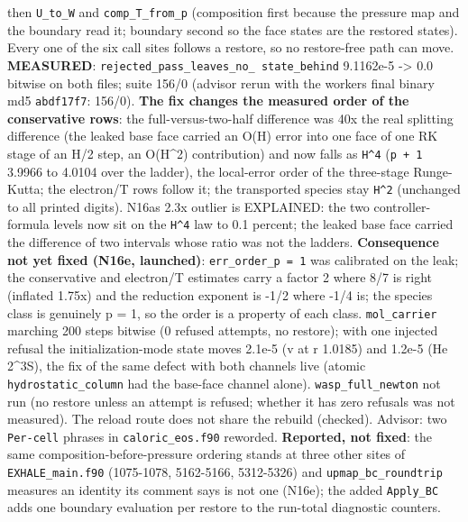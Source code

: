 \documentclass[english,a4paper]{my_memo}
\begin{document}
\begin{itemize}
  then \texttt{U\_to\_W} and \texttt{comp\_T\_from\_p} (composition first because the pressure
  map and the boundary read it; boundary second so the face states are the
  restored state\textquotesingle s). Every one of the six call sites follows a restore, so
  no restore-free path can move. \textbf{MEASURED}: \texttt{rejected\_pass\_leaves\_no\_\ state\_behind} 9.1162e-5 -\textgreater{} 0.0 bitwise on both files; suite 156/0
  (advisor rerun with the worker\textquotesingle s final binary md5 \texttt{abdf17f7}: 156/0).
  \textbf{The fix changes the measured order of the conservative rows}: the
  full-versus-two-half difference was 40x the real splitting difference
  (the leaked base face carried an O(H) error into one face of one RK
  stage of an H/2 step, an O(H\^{}2) contribution) and now falls as \texttt{H\^{}4}
  (\texttt{p\ +\ 1} 3.9966 to 4.0104 over the ladder), the local-error order of the
  three-stage Runge-Kutta; the electron/T rows follow it; the transported
  species stay \texttt{H\^{}2} (unchanged to all printed digits). N16a\textquotesingle s 2.3x outlier
  is EXPLAINED: the two controller-formula levels now sit on the \texttt{H\^{}4} law
  to 0.1 percent; the leaked base face carried the difference of two
  intervals whose ratio was not the ladder\textquotesingle s. \textbf{Consequence not yet fixed
  (N16e, launched)}: \texttt{err\_order\_p\ =\ 1} was calibrated on the leak; the
  conservative and electron/T estimates carry a factor 2 where 8/7 is
  right (inflated 1.75x) and the reduction exponent is -1/2 where -1/4 is;
  the species class is genuinely p = 1, so the order is a property of each
  class. \texttt{mol\_carrier} marching 200 steps bitwise (0 refused attempts, no
  restore); with one injected refusal the initialization-mode state moves
  2.1e-5 (v at r 1.0185) and 1.2e-5 (He 2\^{}3S), the fix of the same defect
  with both channels live (atomic \texttt{hydrostatic\_column} had the base-face
  channel alone). \texttt{wasp\_full\_newton} not run (no restore unless an attempt
  is refused; whether it has zero refusals was not measured). The reload
  route does not share the rebuild (checked). Advisor: two \texttt{Per-cell}
  phrases in \texttt{caloric\_eos.f90} reworded. \textbf{Reported, not fixed}: the same
  composition-before-pressure ordering stands at three other sites of
  \texttt{EXHALE\_main.f90} (1075-1078, 5162-5166, 5312-5326) and
  \texttt{upmap\_bc\_roundtrip} measures an identity its comment says is not one
  (N16e); the added \texttt{Apply\_BC} adds one boundary evaluation per restore to
  the run-total diagnostic counters.

\end{itemize}
\end{document}
